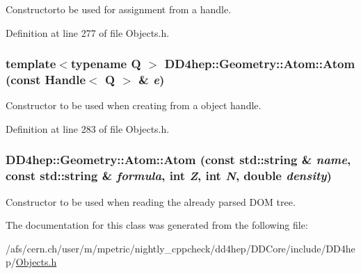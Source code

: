 Constructorto be used for assignment from a handle. 

Definition at line 277 of file Objects.h.\hypertarget{class_d_d4hep_1_1_geometry_1_1_atom_a4f9316b8434e5bbe78289d14d9269b66}{
\subsubsection[{Atom}]{\setlength{\rightskip}{0pt plus 5cm}template$<$typename Q $>$ DD4hep::Geometry::Atom::Atom (const {\bf Handle}$<$ Q $>$ \& {\em e})}}
\label{class_d_d4hep_1_1_geometry_1_1_atom_a4f9316b8434e5bbe78289d14d9269b66}


Constructor to be used when creating from a object handle. 

Definition at line 283 of file Objects.h.\hypertarget{class_d_d4hep_1_1_geometry_1_1_atom_ae9733eb464b82605b59a9d67eae7f161}{
\subsubsection[{Atom}]{\setlength{\rightskip}{0pt plus 5cm}DD4hep::Geometry::Atom::Atom (const std::string \& {\em name}, \/  const std::string \& {\em formula}, \/  int {\em Z}, \/  int {\em N}, \/  double {\em density})}}
\label{class_d_d4hep_1_1_geometry_1_1_atom_ae9733eb464b82605b59a9d67eae7f161}


Constructor to be used when reading the already parsed DOM tree. 

The documentation for this class was generated from the following file:\begin{DoxyCompactItemize}
\item 
/afs/cern.ch/user/m/mpetric/nightly\_\-cppcheck/dd4hep/DDCore/include/DD4hep/\hyperlink{_objects_8h}{Objects.h}\end{DoxyCompactItemize}
